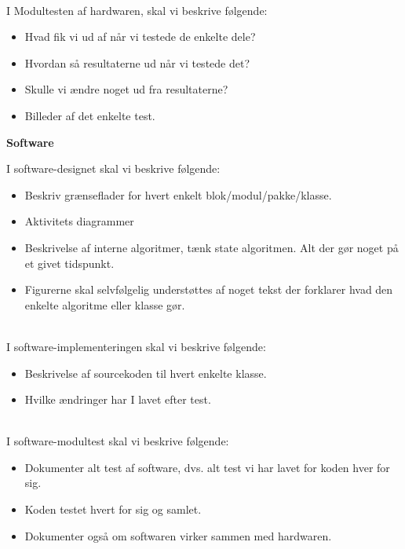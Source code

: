 \documentclass[11pt]{article}
\begin{document}
\\
I Modultesten af hardwaren, skal vi beskrive følgende:

\begin{itemize}
	\item Hvad fik vi ud af når vi testede de enkelte dele?
	\item Hvordan så resultaterne ud når vi testede det?
	\item Skulle vi ændre noget ud fra resultaterne?
	\item Billeder af det enkelte test.
\end{itemize}

\textbf{Software}

I software-designet skal vi beskrive følgende:

\begin{itemize}
	\item Beskriv grænseflader for hvert enkelt blok/modul/pakke/klasse.
	\item Aktivitets diagrammer
	\item Beskrivelse af interne algoritmer, tænk state algoritmen. Alt der gør noget på et givet tidspunkt.
	\item Figurerne skal selvfølgelig understøttes af noget tekst der forklarer hvad den enkelte algoritme eller klasse gør.
\end{itemize}

\\
I software-implementeringen skal vi beskrive følgende:

\begin{itemize}
	\item Beskrivelse af sourcekoden til hvert enkelte klasse.
	\item Hvilke ændringer har I lavet efter test.
\end{itemize}

\\
I software-modultest skal vi beskrive følgende:

\begin{itemize}
	\item Dokumenter alt test af software, dvs. alt test vi har lavet for koden hver for sig.
	\item Koden testet hvert for sig og samlet.
	\item Dokumenter også om softwaren virker sammen med hardwaren.
\end{itemize}
\end{document}
